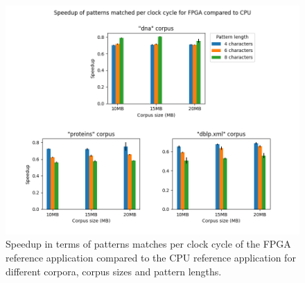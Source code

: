 \begin{figure}[H]
\centering
\includegraphics[width=1.0\textwidth]{figures/speedup_cycles_fpga.png}
\caption{Speedup in terms of patterns matches per clock cycle of the FPGA reference application compared to the CPU reference application for different corpora, corpus sizes and pattern lengths.}
\label{fig:speedup_cycles_fpga}
\end{figure}
